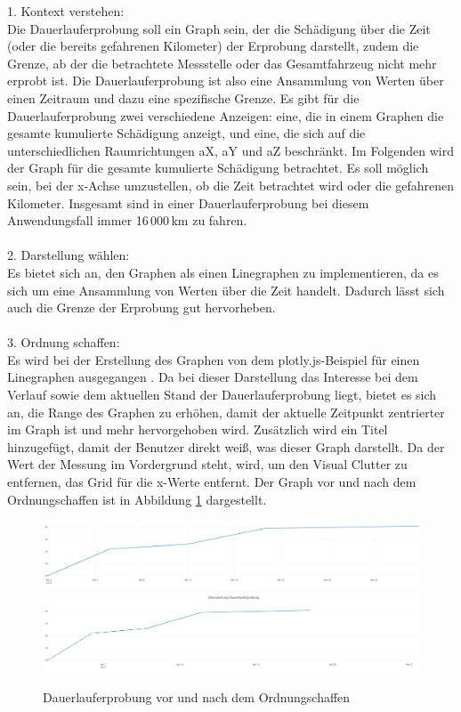 \label{section:dauerlauferprobung}
1. Kontext verstehen:\\
Die Dauerlauferprobung soll ein Graph sein, der die Schädigung über die Zeit (oder die bereits gefahrenen Kilometer) der Erprobung darstellt, zudem die Grenze, ab der die betrachtete Messstelle oder das Gesamtfahrzeug nicht mehr erprobt ist. Die Dauerlauferprobung ist also eine Ansammlung von Werten über einen Zeitraum und dazu eine spezifische Grenze. Es gibt für die Dauerlauferprobung zwei verschiedene Anzeigen: eine, die in einem Graphen die gesamte kumulierte Schädigung anzeigt, und eine, die sich auf die unterschiedlichen Raumrichtungen aX, aY und aZ beschränkt. Im Folgenden wird der Graph für die gesamte kumulierte Schädigung betrachtet. Es soll möglich sein, bei der x-Achse umzustellen, ob die Zeit betrachtet wird oder die gefahrenen Kilometer. Insgesamt sind in einer Dauerlauferprobung bei diesem Anwendungsfall immer 16\,000\,km zu fahren.\\\\
2. Darstellung wählen:\\
Es bietet sich an, den Graphen als einen Linegraphen zu implementieren, da es sich um eine Ansammlung von Werten über die Zeit handelt. Dadurch lässt sich auch die Grenze der Erprobung gut hervorheben.\\\\
 3. Ordnung schaffen:\\
Es wird bei der Erstellung des Graphen von dem plotly.js-Beispiel für einen Linegraphen ausgegangen \cite{Plotly.2024}. Da bei dieser Darstellung das Interesse bei dem Verlauf sowie dem aktuellen Stand der Dauerlauferprobung liegt, bietet es sich an, die Range des Graphen zu erhöhen, damit der aktuelle Zeitpunkt zentrierter im Graph ist und mehr hervorgehoben wird. Zusätzlich wird ein Titel hinzugefügt, damit der Benutzer direkt weiß, was dieser Graph darstellt. Da der Wert der Messung im Vordergrund steht, wird, um den Visual Clutter zu entfernen, das Grid für die x-Werte entfernt. Der Graph vor und nach dem Ordnungschaffen ist in Abbildung \ref{fig:dauerlauferprobung_before} dargestellt.
\begin{figure}[!h]
    \centering
    \includegraphics[width=\linewidth]{gfx/dauerlauferprobung_before.png}
        \includegraphics[width=1\linewidth]{gfx/dauerlauferprobung-after.png}
    \caption{Dauerlauferprobung vor und nach dem Ordnungschaffen}
    \label{fig:dauerlauferprobung_before}
\end{figure}
